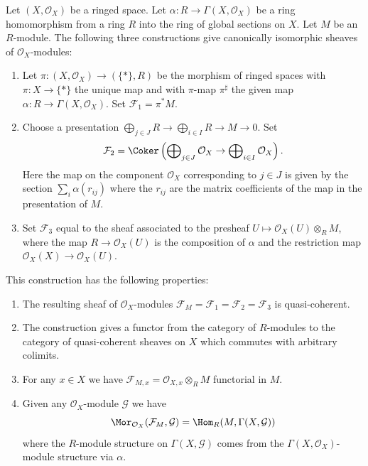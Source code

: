 \begin{lemma}
\label{lemma-construct-quasi-coherent-sheaves}
Let $(X, \mathcal{O}_X)$ be a ringed space.
Let $\alpha : R \to \Gamma(X, \mathcal{O}_X)$ be a ring homomorphism from
a ring $R$ into the ring of global sections on $X$.
Let $M$ be an $R$-module.
The following three constructions give canonically isomorphic
sheaves of $\mathcal{O}_X$-modules:
\begin{enumerate}
\item Let $\pi : (X, \mathcal{O}_X) \longrightarrow (\{*\}, R)$
be the morphism of ringed spaces with $\pi : X \to \{*\}$
the unique map and with $\pi$-map $\pi^\sharp$ the given map
$\alpha : R \to \Gamma(X, \mathcal{O}_X)$. Set $\mathcal{F}_1 = \pi^*M$.
\item Choose a presentation
$\bigoplus_{j \in J} R \to \bigoplus_{i \in I} R \to M \to 0$.
Set
$$
\mathcal{F}_2 = \Coker\left(
\bigoplus\nolimits_{j \in J} \mathcal{O}_X
\to
\bigoplus\nolimits_{i \in I} \mathcal{O}_X
\right).
$$
Here the map on the component $\mathcal{O}_X$ corresponding to $j \in J$
is given by the section $\sum_i \alpha(r_{ij})$ where the $r_{ij}$
are the matrix coefficients of the map in the presentation of $M$.
\item Set $\mathcal{F}_3$ equal to the sheaf associated to the presheaf
$U \mapsto \mathcal{O}_X(U) \otimes_R M$, where the map
$R \to \mathcal{O}_X(U)$ is the composition of $\alpha$ and
the restriction map $\mathcal{O}_X(X) \to \mathcal{O}_X(U)$.
\end{enumerate}
This construction has the following properties:
\begin{enumerate}
\item The resulting sheaf of $\mathcal{O}_X$-modules
$\mathcal{F}_M = \mathcal{F}_1 = \mathcal{F}_2 = \mathcal{F}_3$
is quasi-coherent.
\item The construction gives a functor from
the category of $R$-modules to the category of quasi-coherent
sheaves on $X$ which commutes with arbitrary colimits.
\item For any $x \in X$ we have
$\mathcal{F}_{M, x} = \mathcal{O}_{X, x} \otimes_R M$
functorial in $M$.
\item Given any $\mathcal{O}_X$-module
$\mathcal{G}$ we have
$$
\Mor_{\mathcal{O}_X}(\mathcal{F}_M, \mathcal{G})
=
\Hom_R(M, \Gamma(X, \mathcal{G}))
$$
where the $R$-module structure on $\Gamma(X, \mathcal{G})$
comes from the $\Gamma(X, \mathcal{O}_X)$-module structure via
$\alpha$.
\end{enumerate}
\end{lemma}

